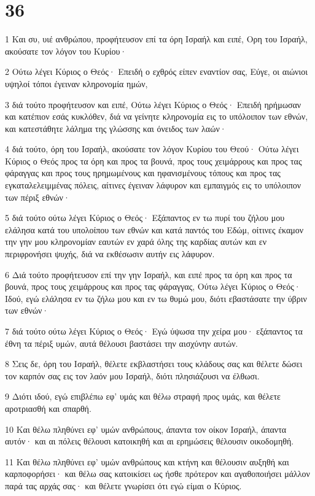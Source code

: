\chapter{36}

\par 1 Και συ, υιέ ανθρώπου, προφήτευσον επί τα όρη Ισραήλ και ειπέ, Ορη του Ισραήλ, ακούσατε τον λόγον του Κυρίου·
\par 2 Ούτω λέγει Κύριος ο Θεός· Επειδή ο εχθρός είπεν εναντίον σας, Εύγε, οι αιώνιοι υψηλοί τόποι έγειναν κληρονομία ημών,
\par 3 διά τούτο προφήτευσον και ειπέ, Ούτω λέγει Κύριος ο Θεός· Επειδή ηρήμωσαν και κατέπιον εσάς κυκλόθεν, διά να γείνητε κληρονομία εις το υπόλοιπον των εθνών, και κατεστάθητε λάλημα της γλώσσης και όνειδος των λαών·
\par 4 διά τούτο, όρη του Ισραήλ, ακούσατε τον λόγον Κυρίου του Θεού· Ούτω λέγει Κύριος ο Θεός προς τα όρη και προς τα βουνά, προς τους χειμάρρους και προς τας φάραγγας και προς τους ηρημωμένους και ηφανισμένους τόπους και προς τας εγκαταλελειμμένας πόλεις, αίτινες έγειναν λάφυρον και εμπαιγμός εις το υπόλοιπον των πέριξ εθνών·
\par 5 διά τούτο ούτω λέγει Κύριος ο Θεός· Εξάπαντος εν τω πυρί του ζήλου μου ελάλησα κατά του υπολοίπου των εθνών και κατά παντός του Εδώμ, οίτινες έκαμον την γην μου κληρονομίαν εαυτών εν χαρά όλης της καρδίας αυτών και εν περιφρονήσει ψυχής, διά να εκθέσωσιν αυτήν εις λάφυρον.
\par 6 Διά τούτο προφήτευσον επί την γην Ισραήλ, και ειπέ προς τα όρη και προς τα βουνά, προς τους χειμάρρους και προς τας φάραγγας, Ούτω λέγει Κύριος ο Θεός· Ιδού, εγώ ελάλησα εν τω ζήλω μου και εν τω θυμώ μου, διότι εβαστάσατε την ύβριν των εθνών·
\par 7 διά τούτο ούτω λέγει Κύριος ο Θεός· Εγώ ύψωσα την χείρα μου· εξάπαντος τα έθνη τα πέριξ υμών, αυτά θέλουσι βαστάσει την αισχύνην αυτών.
\par 8 Σεις δε, όρη του Ισραήλ, θέλετε εκβλαστήσει τους κλάδους σας και θέλετε δώσει τον καρπόν σας εις τον λαόν μου Ισραήλ, διότι πλησιάζουσι να έλθωσι.
\par 9 Διότι ιδού, εγώ επιβλέπω εφ' υμάς και θέλω στραφή προς υμάς, και θέλετε αροτριασθή και σπαρθή.
\par 10 Και θέλω πληθύνει εφ' υμών ανθρώπους, άπαντα τον οίκον Ισραήλ, άπαντα αυτόν· και αι πόλεις θέλουσι κατοικηθή και αι ερημώσεις θέλουσιν οικοδομηθή.
\par 11 Και θέλω πληθύνει εφ' υμών ανθρώπους και κτήνη και θέλουσιν αυξηθή και καρποφορήσει· και θέλω σας κατοικίσει ως ήσθε πρότερον και αγαθοποιήσει μάλλον παρά τας αρχάς σας· και θέλετε γνωρίσει ότι εγώ είμαι ο Κύριος.
